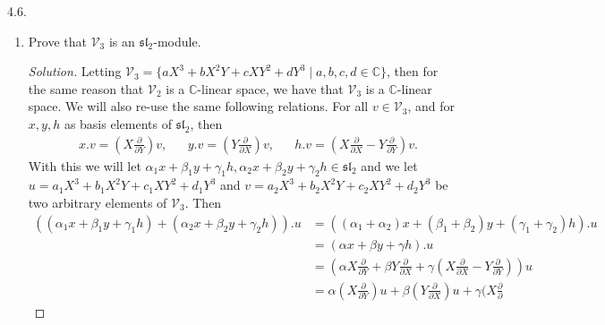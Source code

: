 \documentclass[12pt]{article}
\theoremstyle{definition}
\theoremstyle{definition}
\newenvironment{solution}
  {\renewcommand\qedsymbol{$\blacksquare$}\begin{proof}[Solution]}
  {\end{proof}}
\begin{document}
\begin{enumerate}
            4.6.
            \begin{enumerate}
                \item Prove that $\mathcal{V}_3$ is an
                    $\mathfrak{sl}_2$-module.
                    \begin{solution}
                        Letting $\mathcal{V}_3=\{aX^3+bX^2Y+cXY^2+dY^3\mid a, b,
                        c, d\in\mathbb{C}\}$, then for the same reason that
                        $\mathcal{V}_2$ is a $\mathbb{C}$-linear space, we have
                        that $\mathcal{V}_3$ is a $\mathbb{C}$-linear space. We
                        will also re-use the same following relations. For all
                        $v\in\mathcal{V}_3$, and for $x, y, h$ as basis elements of
                        $\mathfrak{sl}_2$, then 
                        \begin{align*}
                            &x.v = (X\frac{\partial}{\partial Y})v,&
                            &y.v = (Y\frac{\partial}{\partial X})v,&
                            &h.v = (X\frac{\partial}{\partial X}
                            - Y\frac{\partial}{\partial Y})v.
                        \end{align*}
                        With this we will let $\alpha_1x+\beta_1y+\gamma_1h,
                        \alpha_2x+\beta_2y+\gamma_2h\in\mathfrak{sl}_2$ and we let
                        $u=a_1X^3+b_1X^2Y+c_1XY^2+d_1Y^3$ and
                        $v=a_2X^3+b_2X^2Y+c_2XY^2+d_2Y^3$ be two arbitrary elements
                        of $\mathcal{V}_3$. Then
                        \begin{equation*}
                            \begin{split}
                                ((\alpha_1x+\beta_1y+\gamma_1h)+(\alpha_2x+\beta_2y+\gamma_2h)).u
                                &=((\alpha_1+\alpha_2)x+(\beta_1+\beta_2)y+(\gamma_1+\gamma_2)h).u
                                \\ 
                                &=(\alpha x+\beta y+\gamma h).u \\
                                &=(\alpha X\frac{\partial}{\partial
                                Y}+\beta Y\frac{\partial}{\partial X}+\gamma(X\frac{\partial}{\partial X}
                                -Y\frac{\partial}{\partial Y}))u \\
                                &=\alpha (X\frac{\partial}{\partial
                                Y})u+\beta (Y\frac{\partial}{\partial
                                X})u+\gamma(X\frac{\partial}{\partial
}
\end{split}
\end{equation*}
\end{solution}
\end{enumerate}
\end{enumerate}
\end{document}
